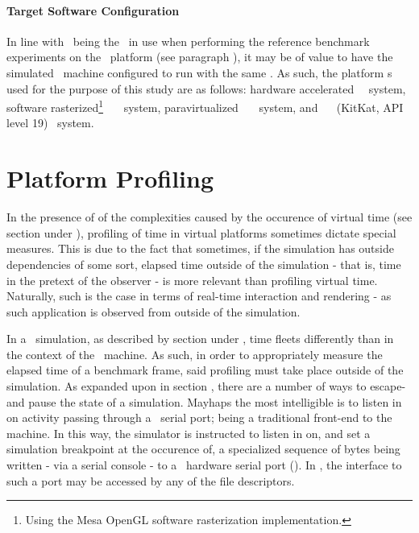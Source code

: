 \paragraph{Target Software Configuration}
\label{par:methodologyexperiment_platformconfiguration_targetsoftwareconfiguration}
In line with \dvttermfedora\ being the \dvttermos\ in use when performing the reference benchmark experiments on the \dvttermhost\ platform (see paragraph ), it may be of value to have the simulated \dvttermtarget\ machine configured to run with the same \dvttermos .
As such, the platform \dvttermos s used for the purpose of this study are as follows: hardware accelerated \dvttermfedora\ \dvttermhost\ system, software rasterized\footnote{Using the Mesa OpenGL software rasterization implementation.} \dvttermfedora\ \dvttermsimics\ \dvttermtarget\ system, paravirtualized \dvttermfedora\ \dvttermsimics\ \dvttermtarget\ system, and \dvttermqemu\ \dvttermandroid\  (KitKat, API level 19) \dvttermtarget\ system.

\section{Platform Profiling}
\label{sec:methodologyexperiment_platformprofiling}
In the presence of of the complexities caused by the occurence of virtual time (see section  under ), profiling of time in virtual platforms sometimes dictate special measures.
This is due to the fact that sometimes, if the simulation has outside dependencies of some sort, elapsed time outside of the simulation - that is, time in the pretext of the observer - is more relevant than profiling virtual time.
Naturally, such is the case in terms of real-time interaction and rendering - as such application is observed from outside of the simulation.

In a \dvttermsimics\ simulation, as described by section  under , time fleets differently than in the context of the \dvttermhost\ machine.
As such, in order to appropriately measure the elapsed time of a benchmark frame, said profiling must take place outside of the simulation.
As expanded upon in section , there are a number of ways to escape- and pause the state of a simulation.
Mayhaps the most intelligible is to listen in on activity passing through a \dvttermtarget\ serial port; being a traditional front-end to the machine.
In this way, the simulator is instructed to listen in on, and set a simulation breakpoint at the occurence of, a specialized sequence of bytes being written - via a serial console - to a \dvttermuart\ hardware serial port ().
In \dvttermlinux , the interface to such a port may be accessed by any of the  file descriptors.

